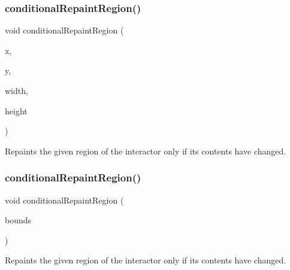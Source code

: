 \subsubsection{\texorpdfstring{conditional\+Repaint\+Region()}{conditionalRepaintRegion()}\hspace{0.1cm}{\footnotesize\ttfamily [1/2]}}
{\footnotesize\ttfamily void conditional\+Repaint\+Region (\begin{DoxyParamCaption}\item[{int}]{x,  }\item[{int}]{y,  }\item[{int}]{width,  }\item[{int}]{height }\end{DoxyParamCaption})\hspace{0.3cm}{\ttfamily [virtual]}}



Repaints the given region of the interactor only if its contents have changed. 

\mbox{\label{classsgl_1_1GDrawingSurface_a3932a12278752db368e24fa404e446aa}} 
\subsubsection{\texorpdfstring{conditional\+Repaint\+Region()}{conditionalRepaintRegion()}\hspace{0.1cm}{\footnotesize\ttfamily [2/2]}}
{\footnotesize\ttfamily void conditional\+Repaint\+Region (\begin{DoxyParamCaption}\item[{const \mbox{\hyperlink{structsgl_1_1GRectangle}{G\+Rectangle}} \&}]{bounds }\end{DoxyParamCaption})\hspace{0.3cm}{\ttfamily [virtual]}}



Repaints the given region of the interactor only if its contents have changed. 

\mbox{\label{classsgl_1_1GDrawingSurface_ae65b7cc9bdfbc1bd01bec80ba83aab47}} 
